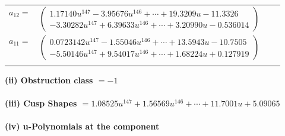 \documentclass[1p]{elsarticle_modified}
\theoremstyle{definition}
\begin{document}
\begin{tabular}{m{7pt} m{180pt} m{7pt} m{180pt} }
\flushright $a_{12}=$&$\begin{pmatrix}1.17140 u^{147}-3.95676 u^{146}+\cdots+19.3209 u-11.3326\\-3.30282 u^{147}+6.39633 u^{146}+\cdots+3.20990 u-0.536014\end{pmatrix}$ \\
\flushright $a_{11}=$&$\begin{pmatrix}0.0723142 u^{147}-1.55046 u^{146}+\cdots+13.5943 u-10.7505\\-5.50146 u^{147}+9.54017 u^{146}+\cdots+1.68224 u+0.127919\end{pmatrix}$\\&\end{tabular}
\flushleft \textbf{(ii) Obstruction class $= -1$}\\~\\
\flushleft \textbf{(iii) Cusp Shapes $= 1.08525 u^{147}+1.56569 u^{146}+\cdots+11.7001 u+5.09065$}\\~\\
\newpage\renewcommand{\arraystretch}{1}
\flushleft \textbf{(iv) u-Polynomials at the component}\newline \\
\end{document}
